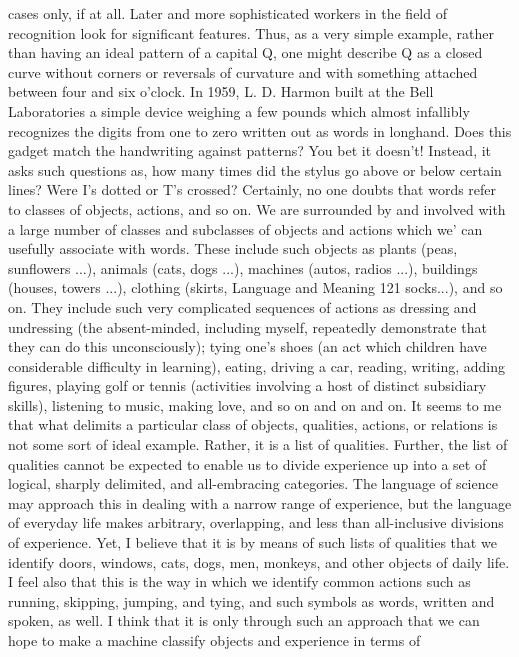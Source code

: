 {{{cases only, if at all.
Later and more sophisticated workers in the field of recognition
look for significant features. Thus, as a very simple example, rather
than having an ideal pattern of a capital Q, one might describe Q
as a closed curve without corners or reversals of curvature and with
something attached between four and six o’clock.
In 1959, L. D. Harmon built at the Bell Laboratories a simple
device weighing a few pounds which almost infallibly recognizes
the digits from one to zero written out as words in longhand. Does
this gadget match the handwriting against patterns? You bet it
doesn’t! Instead, it asks such questions as, how many times did
the stylus go above or below certain lines? Were I’s dotted or T’s
crossed?
Certainly, no one doubts that words refer to classes of objects,
actions, and so on. We are surrounded by and involved with a large
number of classes and subclasses of objects and actions which we'
can usefully associate with words. These include such objects as
plants (peas, sunflowers ...), animals (cats, dogs ...), machines
(autos, radios ...), buildings (houses, towers ...), clothing (skirts,
Language and Meaning
121
socks...), and so on. They include such very complicated sequences
of actions as dressing and undressing (the absent-minded, including
myself, repeatedly demonstrate that they can do this unconsciously);
tying one’s shoes (an act which children have considerable
difficulty in learning), eating, driving a car, reading, writing, adding
figures, playing golf or tennis (activities involving a host of distinct
subsidiary skills), listening to music, making love, and so on and
on and on.
It seems to me that what delimits a particular class of objects,
qualities, actions, or relations is not some sort of ideal example.
Rather, it is a list of qualities. Further, the list of qualities cannot
be expected to enable us to divide experience up into a set of logical,
sharply delimited, and all-embracing categories. The language
of science may approach this in dealing with a narrow range of
experience, but the language of everyday life makes arbitrary,
overlapping, and less than all-inclusive divisions of experience. Yet,
I believe that it is by means of such lists of qualities that we identify
doors, windows, cats, dogs, men, monkeys, and other objects
of daily life. I feel also that this is the way in which we identify
common actions such as running, skipping, jumping, and tying,
and such symbols as words, written and spoken, as well.
I think that it is only through such an approach that we can hope
to make a machine classify objects and experience in terms of
}}}
